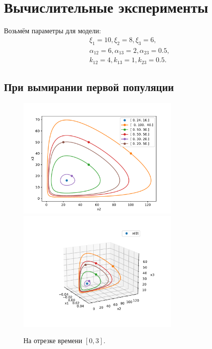 \section{Вычислительные эксперименты}
    Возьмём параметры для модели:
    \[
        \begin{split}
            & \xi_1 = 10, \xi_2 = 8, \xi_3 = 6, \\
            & \alpha_{12} = 6, \alpha_{13} = 2, \alpha_{23} = 0.5, \\
            & k_{12} = 4, k_{13} = 1, k_{23} = 0.5.
        \end{split}
    \]

    \subsection{При вымирании первой популяции}

    \begin{figure}[H]
        
        \includegraphics[width=8cm]{pictures/x1_0phase.pdf}
        \includegraphics[width=8cm]{pictures/x1_0phase3.pdf}
        \caption{На отрезке времени \( [0, 3] \).}
    \end{figure}